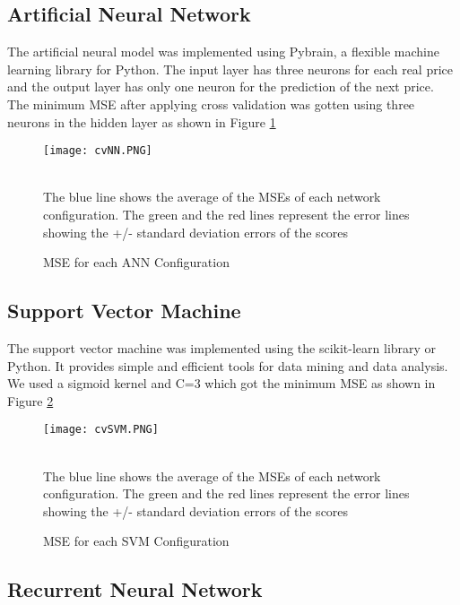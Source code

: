 \subsection{Artificial Neural Network}

The artificial neural model was implemented using Pybrain, a flexible machine learning library for Python. The input layer has three neurons for each real price and the output layer has only one neuron for the prediction of the next price. The minimum MSE after applying cross validation was gotten using three neurons in the hidden layer as shown in  Figure \ref{fig:cvNN}

\begin{figure}[h]
\centering
\texttt{[image: cvNN.PNG]}
\caption{MSE for each ANN Configuration}
\begin{minipage}{12cm}
    \footnotesize
    \emph \\ The blue line shows the average of the MSEs of each network configuration. The green and the red lines represent the error lines showing the +/- standard deviation errors of the scores
    \end{minipage}
\label{fig:cvNN}
\end{figure}

\subsection{Support Vector Machine}
The support vector machine was implemented using the scikit-learn library or Python. It provides simple and efficient tools for data mining and data analysis. We used a sigmoid kernel and C=3 which got the minimum MSE as shown in Figure \ref{fig:cvSVM}

\begin{figure}[h]
\centering
\texttt{[image: cvSVM.PNG]}
\caption{MSE for each SVM Configuration}
\begin{minipage}{12cm}
    \footnotesize
    \emph \\ The blue line shows the average of the MSEs of each network configuration. The green and the red lines represent the error lines showing the +/- standard deviation errors of the scores
    \end{minipage}

\label{fig:cvSVM}
\end{figure}

\subsection{Recurrent Neural Network}


